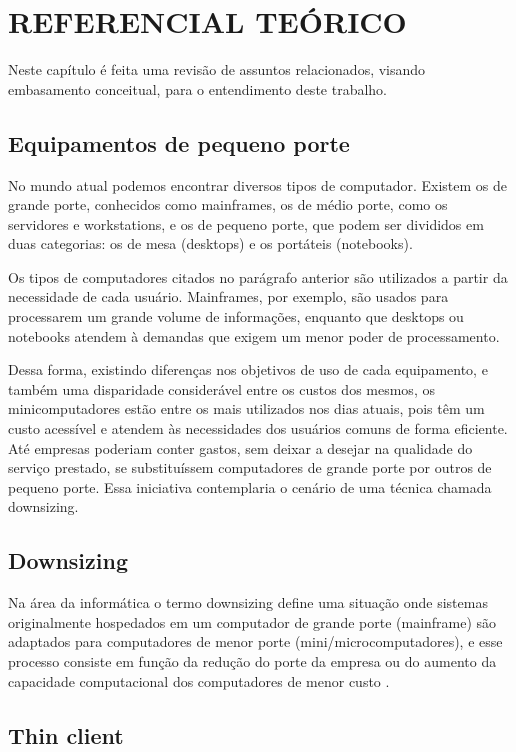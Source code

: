 \chapter{REFERENCIAL TEÓRICO}

Neste capítulo é feita uma revisão de assuntos relacionados, visando embasamento conceitual, para o entendimento deste trabalho.

\section{Equipamentos de pequeno porte}

No mundo atual podemos encontrar diversos tipos de computador. Existem os de grande porte, conhecidos como mainframes, os de médio porte, como os servidores e workstations, e os de pequeno porte, que podem ser divididos em duas categorias: os de mesa (desktops) e os portáteis (notebooks).

Os tipos de computadores citados no parágrafo anterior são utilizados a partir da necessidade de cada usuário. Mainframes, por exemplo, são usados para processarem um grande volume de informações, enquanto que desktops ou notebooks atendem à demandas que exigem um menor poder de processamento.

Dessa forma, existindo diferenças nos objetivos de uso de cada equipamento, e também uma disparidade considerável entre os custos dos mesmos, os minicomputadores estão entre os mais utilizados nos dias atuais, pois têm um custo acessível e atendem às necessidades dos usuários comuns de forma eficiente. Até empresas poderiam conter gastos, sem deixar a desejar na qualidade do serviço prestado, se substituíssem computadores de grande porte por outros de pequeno porte. Essa iniciativa contemplaria o cenário de uma técnica chamada downsizing.

\section{Downsizing}

Na área da informática o termo downsizing define uma situação onde sistemas originalmente hospedados em um computador de grande porte (mainframe) são adaptados para computadores de menor porte (mini/microcomputadores), e esse processo consiste em função da redução do porte da empresa ou do aumento da capacidade computacional dos computadores de menor custo \cite{WIKIPEDIA3}.

\section{Thin client}

